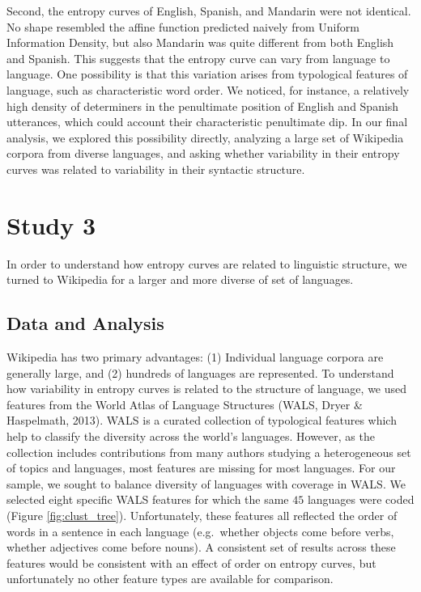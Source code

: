 \documentclass[10pt, letterpaper]{article}
\begin{document}
Second, the entropy curves of English, Spanish, and Mandarin were not
identical. No shape resembled the affine function predicted naively from
Uniform Information Density, but also Mandarin was quite different from
both English and Spanish. This suggests that the entropy curve can vary
from language to language. One possibility is that this variation arises
from typological features of language, such as characteristic word
order. We noticed, for instance, a relatively high density of
determiners in the penultimate position of English and Spanish
utterances, which could account their characteristic penultimate dip. In
our final analysis, we explored this possibility directly, analyzing a
large set of Wikipedia corpora from diverse languages, and asking
whether variability in their entropy curves was related to variability
in their syntactic structure.

\hypertarget{study-3}{%
\section{Study 3}\label{study-3}}

In order to understand how entropy curves are related to linguistic
structure, we turned to Wikipedia for a larger and more diverse of set
of languages.

\hypertarget{data-and-analysis-2}{%
\subsection{Data and Analysis}\label{data-and-analysis-2}}

Wikipedia has two primary advantages: (1) Individual language corpora
are generally large, and (2) hundreds of languages are represented. To
understand how variability in entropy curves is related to the structure
of language, we used features from the World Atlas of Language
Structures (WALS, Dryer \& Haspelmath, 2013). WALS is a curated
collection of typological features which help to classify the diversity
across the world's languages. However, as the collection includes
contributions from many authors studying a heterogeneous set of topics
and languages, most features are missing for most languages. For our
sample, we sought to balance diversity of languages with coverage in
WALS. We selected eight specific WALS features for which the same \(45\)
languages were coded (Figure \ref{fig:clust_tree}). Unfortunately, these
features all reflected the order of words in a sentence in each language
(e.g.~whether objects come before verbs, whether adjectives come before
nouns). A consistent set of results across these features would be
consistent with an effect of order on entropy curves, but unfortunately
no other feature types are available for comparison.
\end{document}
